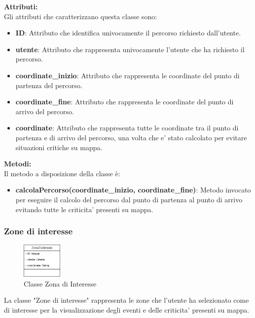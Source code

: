 \documentclass{article}
\begin{document}
\textbf{Attributi:}\\
Gli attributi che caratterizzano questa classe sono:
\begin{itemize}
    \item \textbf{ID}: Attributo che identifica univocamente il percorso richiesto dall'utente.
    \item \textbf{utente}: Attributo che rappresenta univocamente l'utente che ha richiesto il percorso.
    \item \textbf{coordinate\_inizio}: Attributo che rappresenta le coordinate del punto di partenza del percorso.
    \item \textbf{coordinate\_fine}: Attributo che rappresenta le coordinate del punto di arrivo del percorso.
    \item \textbf{coordinate}: Attributo che rappresenta tutte le coordinate tra il punto di partenza e di arrivo del percorso, una volta che e' stato calcolato per evitare situazioni critiche su mappa.
\end{itemize}

\textbf{Metodi:}\\
Il metodo a disposizione della classe è:
\begin{itemize}
    \item \textbf{calcolaPercorso(coordinate\_inizio, coordinate\_fine)}: Metodo invocato per eseguire il calcolo del percorso dal punto di partenza al punto di arrivo evitando tutte le criticita' presenti su mappa.
\end{itemize}

\clearpage

\subsubsection{Zone di interesse}

\begin{figure}[htbp]
    \centering
    \includegraphics[width=0.175\textwidth]{Images/zona_class.png}
    \caption{Classe Zona di Interesse}
    \label{fig:zona}
\end{figure}

La classe "Zone di interesse" rappresenta le zone che l'utente ha selezionato come di interesse per la visualizzazione degli eventi e delle criticita' presenti su mappa.\\
\end{document}
